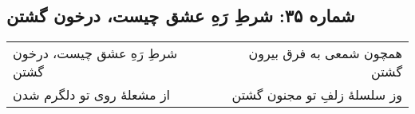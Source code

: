 \begin{center}
\section*{شماره ۳۵: شرطِ رَهِ عشق چیست، درخون گشتن}
\label{sec:035}
\begin{longtable}{l p{0.5cm} r}
شرطِ رَهِ عشق چیست، درخون گشتن
&&
همچون شمعی به فرق بیرون گشتن
\\
از مشعلهٔ روی تو دلگرم شدن
&&
وز سلسلهٔ زلفِ تو مجنون گشتن
\\
\end{longtable}
\end{center}
